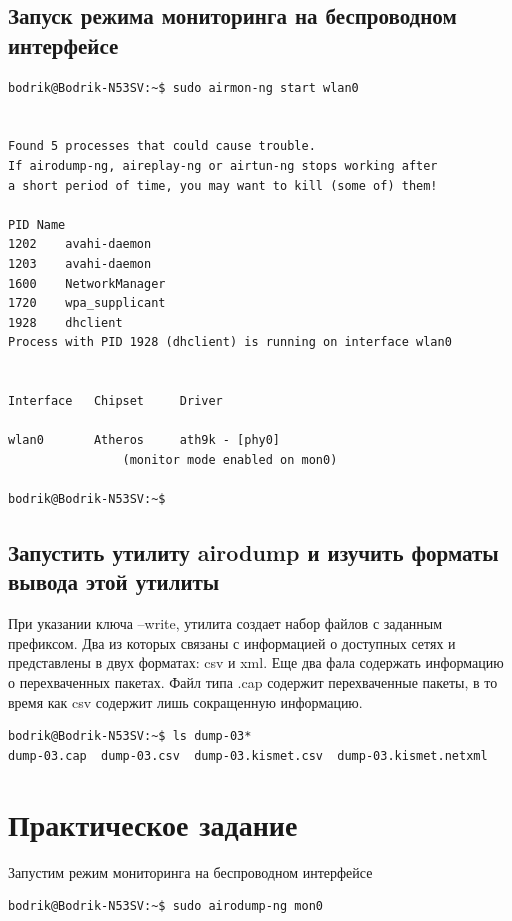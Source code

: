 \subsection{Запуск режима мониторинга на беспроводном интерфейсе}
\begin{lstlisting}
bodrik@Bodrik-N53SV:~$ sudo airmon-ng start wlan0


Found 5 processes that could cause trouble.
If airodump-ng, aireplay-ng or airtun-ng stops working after
a short period of time, you may want to kill (some of) them!

PID	Name
1202	avahi-daemon
1203	avahi-daemon
1600	NetworkManager
1720	wpa_supplicant
1928	dhclient
Process with PID 1928 (dhclient) is running on interface wlan0


Interface	Chipset		Driver

wlan0		Atheros 	ath9k - [phy0]
				(monitor mode enabled on mon0)

bodrik@Bodrik-N53SV:~$ 
\end{lstlisting}
\subsection{Запустить утилиту airodump и изучить форматы вывода этой утилиты}
При указании ключа --write, утилита создает набор файлов с заданным префиксом. Два из которых связаны с информацией о доступных сетях и представлены в двух форматах: csv и xml. Еще два фала содержать информацию о перехваченных пакетах. Файл типа .cap содержит перехваченные пакеты, в то время как csv содержит лишь сокращенную информацию.

\begin{lstlisting}
bodrik@Bodrik-N53SV:~$ ls dump-03*
dump-03.cap  dump-03.csv  dump-03.kismet.csv  dump-03.kismet.netxml
\end{lstlisting}
\section{Практическое задание}
Запустим режим мониторинга на беспроводном интерфейсе

\begin{lstlisting}
bodrik@Bodrik-N53SV:~$ sudo airodump-ng mon0
\end{lstlisting}


